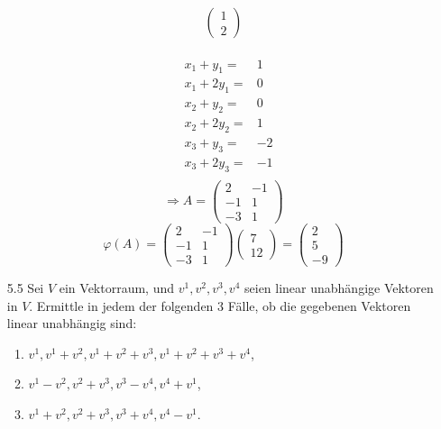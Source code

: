 \documentclass{HM}
\begin{document}
\begin{enumerate}
$$\begin{pmatrix}
1\\
2
\end{pmatrix}$$\\
\begin{align*}
&x_1+y_1=&1\\
&x_1+2y_1=&0\\
&x_2+y_2=&0\\
&x_2+2y_2=&1\\
&x_3+y_3=&-2\\
&x_3+2y_3=&-1\\
\end{align*}
$$\Rightarrow A=\begin{pmatrix}
2&-1\\
-1&1\\
-3&1
\end{pmatrix}$$
$$\varphi(A)=\begin{pmatrix}
2&-1\\
-1&1\\
-3&1
\end{pmatrix}\begin{pmatrix}
7\\
12
\end{pmatrix}=\begin{pmatrix}
2\\
5\\
-9
\end{pmatrix}$$
\item [5.5] Sei $V$ ein Vektorraum, und $v^1,v^2,v^3,v^4$ seien linear unabhängige Vektoren in $V$. Ermittle in jedem der folgenden 3 Fälle, ob die gegebenen Vektoren linear unabhängig sind:
\begin{enumerate}
\item $v^1, v^1+v^2, v^1+v^2+v^3, v^1+v^2+v^3+v^4$,
\item $v^1-v^2, v^2+v^3, v^3-v^4, v^4+v^1$,
\item $v^1+v^2, v^2+v^3, v^3+v^4, v^4-v^1$.
\end{enumerate}
\end{enumerate}
\end{document}
